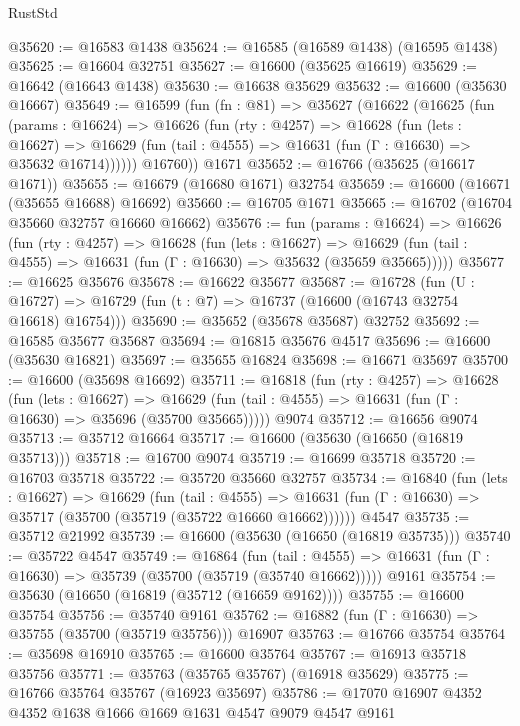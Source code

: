 \begin{lexlean}{RustStd}
\begin{coremodule}
@35620 := @16583 @1438
@35624 := @16585 (@16589 @1438) (@16595 @1438)
@35625 := @16604 @32751
@35627 := @16600 (@35625 @16619)
@35629 := @16642 (@16643 @1438)
@35630 := @16638 @35629
@35632 := @16600 (@35630 @16667)
@35649 := @16599
    (fun (fn : @81) =>
    @35627
      (@16622
        (@16625
          (fun (params : @16624) =>
          @16626
            (fun (rty : @4257) =>
            @16628
              (fun (lets : @16627) =>
              @16629 (fun (tail : @4555) => @16631 (fun (Γ : @16630) => @35632 @16714))))))
        @16760))
    @1671
@35652 := @16766 (@35625 (@16617 @1671))
@35655 := @16679 (@16680 @1671) @32754
@35659 := @16600 (@16671 (@35655 @16688) @16692)
@35660 := @16705 @1671
@35665 := @16702 (@16704 @35660 @32757 @16660 @16662)
@35676 := fun (params : @16624) =>
  @16626
    (fun (rty : @4257) =>
    @16628
      (fun (lets : @16627) =>
      @16629 (fun (tail : @4555) => @16631 (fun (Γ : @16630) => @35632 (@35659 @35665)))))
@35677 := @16625 @35676
@35678 := @16622 @35677
@35687 := @16728
    (fun (U : @16727) => @16729 (fun (t : @7) => @16737 (@16600 (@16743 @32754 @16618) @16754)))
@35690 := @35652 (@35678 @35687) @32752
@35692 := @16585 @35677 @35687
@35694 := @16815 @35676 @4517
@35696 := @16600 (@35630 @16821)
@35697 := @35655 @16824
@35698 := @16671 @35697
@35700 := @16600 (@35698 @16692)
@35711 := @16818
    (fun (rty : @4257) =>
    @16628
      (fun (lets : @16627) =>
      @16629 (fun (tail : @4555) => @16631 (fun (Γ : @16630) => @35696 (@35700 @35665)))))
    @9074
@35712 := @16656 @9074
@35713 := @35712 @16664
@35717 := @16600 (@35630 (@16650 (@16819 @35713)))
@35718 := @16700 @9074
@35719 := @16699 @35718
@35720 := @16703 @35718
@35722 := @35720 @35660 @32757
@35734 := @16840
    (fun (lets : @16627) =>
    @16629
      (fun (tail : @4555) =>
      @16631 (fun (Γ : @16630) => @35717 (@35700 (@35719 (@35722 @16660 @16662))))))
    @4547
@35735 := @35712 @21992
@35739 := @16600 (@35630 (@16650 (@16819 @35735)))
@35740 := @35722 @4547
@35749 := @16864
    (fun (tail : @4555) => @16631 (fun (Γ : @16630) => @35739 (@35700 (@35719 (@35740 @16662)))))
    @9161
@35754 := @35630 (@16650 (@16819 (@35712 (@16659 @9162))))
@35755 := @16600 @35754
@35756 := @35740 @9161
@35762 := @16882 (fun (Γ : @16630) => @35755 (@35700 (@35719 @35756))) @16907
@35763 := @16766 @35754
@35764 := @35698 @16910
@35765 := @16600 @35764
@35767 := @16913 @35718 @35756
@35771 := @35763 (@35765 @35767) (@16918 @35629)
@35775 := @16766 @35764 @35767 (@16923 @35697)
@35786 := @17070 @16907 @4352 @4352 @1638 @1666 @1669 @1631 @4547 @9079 @4547 @9161

\end{coremodule}
\end{lexlean}
